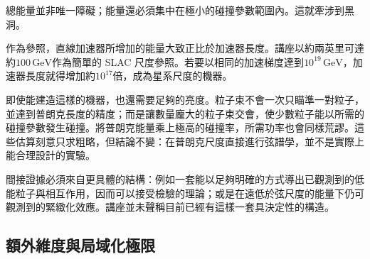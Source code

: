 總能量並非唯一障礙；能量還必須集中在極小的碰撞參數範圍內。這就牽涉到黑洞。

\begin{classroomqa}
\end{classroomqa}

作為參照，直線加速器所增加的能量大致正比於加速器長度。講座以約兩英里可達約\(100\,\mathrm{GeV}\)作為簡單的 SLAC 尺度參照。若要以相同的加速梯度達到\(10^{19}\,\mathrm{GeV}\)，加速器長度就得增加約\(10^{17}\)倍，成為星系尺度的機器。

即使能建造這樣的機器，也還需要足夠的亮度。粒子束不會一次只瞄準一對粒子，並達到普朗克長度的精度；而是讓數量龐大的粒子束交會，使少數粒子能以所需的碰撞參數發生碰撞。將普朗克能量乘上極高的碰撞率，所需功率也會同樣荒謬。這些估算刻意只求粗略，但結論不變：在普朗克尺度直接進行弦譜學，並不是實際上能合理設計的實驗。

間接證據必須來自更具體的結構：例如一套能以足夠明確的方式導出已觀測到的低能粒子與相互作用，因而可以接受檢驗的理論；或是在遠低於弦尺度的能量下仍可觀測到的緊緻化效應。講座並未聲稱目前已經有這樣一套具決定性的構造。

\subsection{額外維度與局域化極限}

\begin{classroomqa}
\end{classroomqa}

\begin{classroomqa}
\end{classroomqa}


